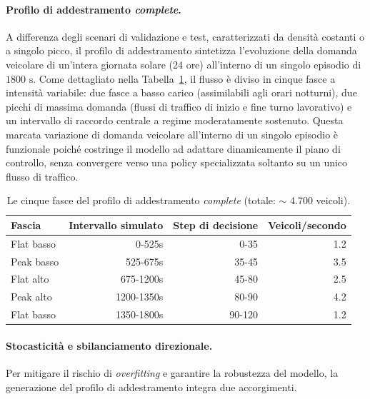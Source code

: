 \paragraph{Profilo di addestramento \emph{complete}.}
A differenza degli scenari di validazione e test, caratterizzati da densità costanti o a singolo picco,
il profilo di addestramento sintetizza l'evoluzione della domanda veicolare di un'intera giornata solare (24 ore) all'interno di un singolo episodio di $1800 \text{ s}$.
Come dettagliato nella Tabella~\ref{tab:workday}, il flusso è diviso in cinque fasce a intensità variabile:
due fasce a basso carico (assimilabili agli orari notturni),
due picchi di massima domanda (flussi di traffico di inizio e fine turno lavorativo) e
un intervallo di raccordo centrale a regime moderatamente sostenuto.
Questa marcata variazione di domanda veicolare all'interno di un singolo episodio è funzionale poiché costringe il modello ad adattare dinamicamente il piano di controllo,
senza convergere verso una policy specializzata soltanto su un unico flusso di traffico.

\begin{table}[htbp]
  \centering
  \small
  \begin{tabular}{@{}p{4.3cm}rrr@{}}
    \toprule
    Fascia     & Intervallo simulato & Step di decisione & Veicoli/secondo \\
    \midrule
    Flat basso & 0-525s              & 0-35              & 1.2             \\
    Peak basso & 525-675s            & 35-45             & 3.5             \\
    Flat alto  & 675-1200s           & 45-80             & 2.5             \\
    Peak alto  & 1200-1350s          & 80-90             & 4.2             \\
    Flat basso & 1350-1800s          & 90-120            & 1.2             \\
    \bottomrule
  \end{tabular}
  \caption{Le cinque fasce del profilo di addestramento \emph{complete}
    (totale: $\sim$ 4.700 veicoli).}
  \label{tab:workday}
\end{table}

\paragraph{Stocasticità e sbilanciamento direzionale.}
Per mitigare il rischio di \emph{overfitting} e garantire la robustezza del modello,
la generazione del profilo di addestramento integra due accorgimenti.

